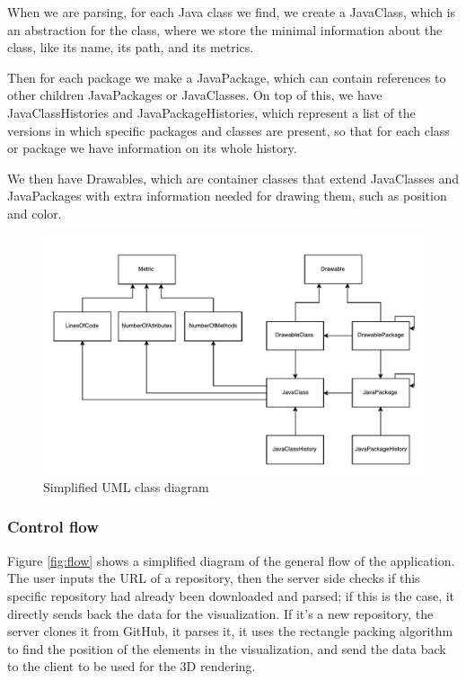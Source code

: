 \documentclass[]{usiinfbachelorproject}
\begin{document}
When we are parsing, for each Java class we find, we create a JavaClass, which is an abstraction for the class, where we store the minimal information about the class, like its name, its path, and its metrics.

Then for each package we make a JavaPackage, which can contain references to other children JavaPackages or JavaClasses.
On top of this, we have JavaClassHistories and JavaPackageHistories, which represent a list of the versions in which specific packages and classes are present, so that for each class or package we have information on its whole history.

We then have Drawables, which are container classes that extend JavaClasses and JavaPackages with extra information needed for drawing them, such as position and color.

\begin{figure} [H]
\centering
\includegraphics[width=1\textwidth]{pictures/models.pdf}
\caption{Simplified UML class diagram}
\label{fig:UML}
\end{figure}

\subsubsection{Control flow} \label{Control flow}
Figure \ref{fig:flow} shows a simplified diagram of the general flow of the application. The user inputs the URL of a repository, then the server side checks if this specific repository had already been downloaded and parsed; if this is the case, it directly sends back the data for the visualization. If it's a new repository, the server clones it from GitHub, it parses it, it uses the rectangle packing algorithm to find the position of the elements in the visualization, and send the data back to the client to be used for the 3D rendering.
\end{document}
